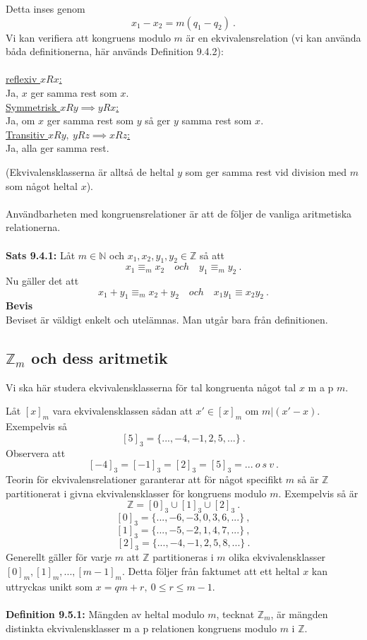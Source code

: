 \documentclass{article}
\begin{document}
Detta inses genom
$$
x_1-x_2=m(q_1-q_2) \ .
$$
Vi kan verifiera att kongruens modulo $m$ är en ekvivalensrelation (vi kan använda båda definitionerna, här används Definition 9.4.2):\\ \\
\underline{reflexiv $xRx$:}\\
Ja, $x$ ger samma rest som $x$.\\
\underline{Symmetrisk $xRy\implies yRx$:}\\
Ja, om $x$ ger samma rest som $y$ så ger $y$ samma rest som $x$.\\
\underline{Transitiv $xRy, \ yRz\implies xRz$:}\\
Ja, alla ger samma rest.

(Ekvivalensklasserna är alltså de heltal $y$ som ger samma rest vid division med $m$ som något heltal $x$).\\ \\
Användbarheten med kongruensrelationer är att de följer de vanliga aritmetiska relationerna.\\ \\
\textbf{Sats 9.4.1:} Låt $m\in\mathbb{N}$ och $x_1,x_2,y_1,y_2\in\mathbb{Z}$ så att
$$
x_1\equiv_mx_2 \quad och \quad y_1\equiv_m y_2 \ .
$$
Nu gäller det att
$$
x_1+y_1\equiv_m x_2+y_2 \quad och \quad x_1y_1\equiv x_2y_2 \ .
$$
\textbf{Bevis}\\
Beviset är väldigt enkelt och utelämnas. Man utgår bara från definitionen.
\subsection{$\mathbb{Z}_m$ och dess aritmetik}
Vi ska här studera ekvivalensklasserna för tal kongruenta något tal $x$ m a p $m$. 

Låt $[x]_m$ vara ekvivalensklassen sådan att $x'\in[x]_m$ om $m|(x'-x)$. Exempelvis så
$$
[5]_3=\{...,-4,-1,2,5,...\} \ .
$$
Observera att
$$
[-4]_3=[-1]_3=[2]_3=[5]_3=... \ o \ s \ v \ .
$$
Teorin för ekvivalensrelationer garanterar att för något specifikt $m$ så är $\mathbb{Z}$ partitionerat i givna ekvivalensklasser för kongruens modulo $m$. Exempelvis så är 
$$
\mathbb{Z}=[0]_3\cup[1]_3\cup[2]_3 \ .
$$
$$
[0]_3=\{...,-6,-3,0,3,6,...\} \ ,
$$
$$
[1]_3=\{...,-5,-2,1,4,7,...\} \ ,
$$
$$
[2]_3=\{...,-4,-1,2,5,8,...\} \ .
$$
Generellt gäller för varje $m$ att $\mathbb{Z}$ partitioneras i $m$ olika ekvivalensklasser $[0]_m,[1]_m,...,[m-1]_m$. Detta följer från faktumet att ett heltal $x$ kan uttryckas unikt som $x=qm+r, \ 0\leq r \leq m-1$.\\ \\
\textbf{Definition 9.5.1:} Mängden av heltal modulo $m$, tecknat $\mathbb{Z}_m$, är mängden distinkta ekvivalensklasser m a p relationen kongruens modulo $m$ i $\mathbb{Z}$.\\
\end{document}
